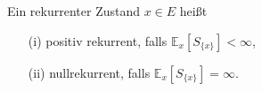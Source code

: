 Ein rekurrenter Zustand $x \in E$ heißt
\begin{itemize}
\item[(i)] positiv rekurrent, falls $\mathbb{E}_{x}[S_{\lbrace x \rbrace}] < \infty$,
\item[(ii)] nullrekurrent, falls $\mathbb{E}_{x}[S_{\lbrace x \rbrace}] = \infty$.
\end{itemize}
